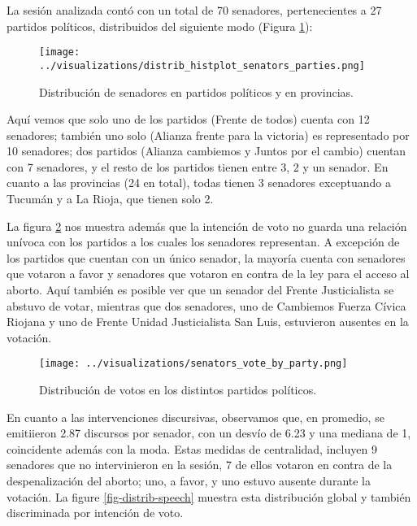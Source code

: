La sesión analizada contó con un total de 70 senadores,
pertenecientes a 27 partidos políticos, distribuidos del
siguiente modo (Figura \ref{fig-distrib-senators}):

\begin{figure}[h!]
\centering
\texttt{[image: ../visualizations/distrib\_histplot\_senators\_parties.png]}
\caption{Distribución de senadores en partidos políticos y en provincias.}
\label{fig-distrib-senators}
\end{figure}

Aquí vemos que solo uno de los partidos (Frente de todos) cuenta con 12
senadores; también uno solo (Alianza frente para la victoria) es
representado por 10 senadores; dos partidos (Alianza cambiemos y
Juntos por el cambio) cuentan con 7 senadores, y el resto de los
partidos tienen entre 3, 2 y un senador.
En cuanto a las provincias (24 en total), todas tienen 3 senadores
exceptuando a Tucumán y a La Rioja, que tienen solo 2.

La figura \ref{fig-distrib-vote} nos muestra además que la intención
de voto no guarda una relación unívoca con los partidos a los cuales los
senadores representan. A excepción de los partidos que cuentan con un único
senador, la mayoría cuenta con senadores que votaron a favor y senadores
que votaron en contra de la ley para el acceso al aborto. Aquí también
es posible ver que un senador del Frente Justicialista se abstuvo de votar,
mientras que dos senadores, uno de Cambiemos Fuerza Cívica Riojana y uno de
Frente Unidad Justicialista San Luis, estuvieron ausentes en la votación.

\begin{figure}[h!]
\centering
\texttt{[image: ../visualizations/senators\_vote\_by\_party.png]}
\caption{Distribución de votos en los distintos partidos políticos.}
\label{fig-distrib-vote}
\end{figure}

En cuanto a las intervenciones discursivas, observamos que, en promedio, se emitiieron
2.87 discursos por senador, con un desvío de 6.23 y una mediana de 1, coincidente además
con la moda. Estas medidas de centralidad, incluyen 9 senadores que no intervinieron en
la sesión, 7 de ellos votaron en contra de la despenalización del aborto; uno, a favor,
y uno estuvo ausente durante la votación. La figure \ref{fig-distrib-speech} muestra esta
distribución global y también discriminada por intención de voto.


